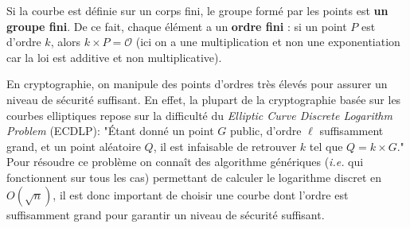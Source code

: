 \documentclass[french,a4paper,11pt]{exam}
\begin{document}
Si la courbe est définie sur un corps fini, le groupe formé par les points est
\textbf{un groupe fini}. De ce fait, chaque élément a un \textbf{ordre fini} :
si un point $P$ est d'ordre $k$, alors $k\times P = \mathcal{O}$ (ici on a une
multiplication et non une exponentiation car la loi est additive et non
multiplicative).

En cryptographie, on manipule des points d'ordres très élevés pour assurer un
niveau de sécurité suffisant.  En effet, la plupart de la cryptographie basée
sur les courbes elliptiques repose sur la difficulté du \textit{Elliptic Curve
  Discrete Logarithm Problem} (ECDLP): "Étant donné un point $G$ public,
d'ordre $\ell$ suffisamment grand, et un point aléatoire $Q$, il est infaisable
de retrouver $k$ tel que $Q = k\times G$."  Pour résoudre ce problème on connaît
des algorithme génériques (\textit{i.e.} qui fonctionnent sur tous les cas)
permettant de calculer le logarithme discret en $O(\sqrt n)$, il est donc
important de choisir une courbe dont l'ordre est suffisamment grand pour
garantir un niveau de sécurité suffisant.  \vspace*{0.2cm}
\end{document}
